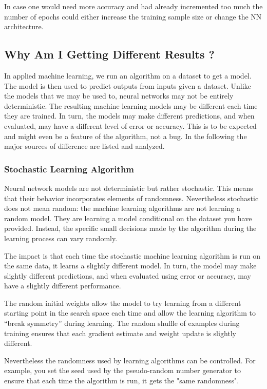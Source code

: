 In case one would need more accuracy and had already incremented too much the number of epochs could either increase the training sample size or change the NN architecture.

\subsection{Why Am I Getting Different Results ?}

In applied machine learning, we run an algorithm on a dataset to get a model. The model is then used to predict outputs from inputs given a dataset. Unlike the models that we may be used to, neural networks may not be entirely deterministic.
The resulting machine learning models may be different each time they are trained. In turn, the models may make different predictions, and when evaluated, may have a different level of error or accuracy. This is to be expected and might even be a feature of the algorithm, not a bug.
In the following the major sources of difference are listed and analyzed.

\subsubsection{Stochastic Learning Algorithm}

Neural network models are not deterministic but rather stochastic. This means that their behavior incorporates elements of randomness.
Nevertheless stochastic does not mean random: the machine learning algorithms are not learning a random model. They are learning a model conditional on the dataset you have provided. Instead, the specific small decisions made by the algorithm during the learning process can vary randomly.

The impact is that each time the stochastic machine learning algorithm is run on the same data, it learns a slightly different model. In turn, the model may make slightly different predictions, and when evaluated using error or accuracy, may have a slightly different performance.

The random initial weights allow the model to try learning from a different starting point in the search space each time and allow the learning algorithm to “break symmetry” during learning. The random shuffle of examples during training ensures that each gradient estimate and weight update is slightly different.

Nevertheless the randomness used by learning algorithms can be controlled. For example, you set the seed used by the pseudo-random number generator to ensure that each time the algorithm is run, it gets the "same randomness".

